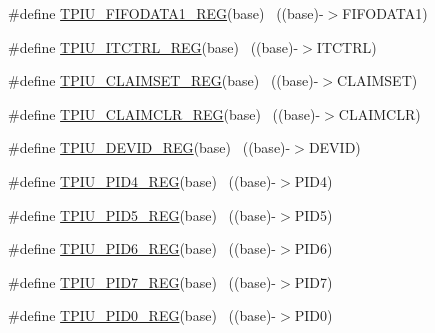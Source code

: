 \begin{DoxyCompactItemize}
\item 
\#define \hyperlink{group___t_p_i_u___register___accessor___macros_ga94e7646ffbef879b19b84538655f8661}{T\+P\+I\+U\+\_\+\+F\+I\+F\+O\+D\+A\+T\+A1\+\_\+\+R\+EG}(base)                              ~((base)-\/$>$F\+I\+F\+O\+D\+A\+T\+A1)
\item 
\#define \hyperlink{group___t_p_i_u___register___accessor___macros_ga3fb80a5db7419d9b28f36030fa56c9f6}{T\+P\+I\+U\+\_\+\+I\+T\+C\+T\+R\+L\+\_\+\+R\+EG}(base)                                    ~((base)-\/$>$I\+T\+C\+T\+RL)
\item 
\#define \hyperlink{group___t_p_i_u___register___accessor___macros_ga36e2ff51a935b49ba3848abac32d9771}{T\+P\+I\+U\+\_\+\+C\+L\+A\+I\+M\+S\+E\+T\+\_\+\+R\+EG}(base)                                ~((base)-\/$>$C\+L\+A\+I\+M\+S\+ET)
\item 
\#define \hyperlink{group___t_p_i_u___register___accessor___macros_ga0e17510140274c78c7590de1b5d39c75}{T\+P\+I\+U\+\_\+\+C\+L\+A\+I\+M\+C\+L\+R\+\_\+\+R\+EG}(base)                                ~((base)-\/$>$C\+L\+A\+I\+M\+C\+LR)
\item 
\#define \hyperlink{group___t_p_i_u___register___accessor___macros_ga30d4f93f5e89c158bb79417caf4daa37}{T\+P\+I\+U\+\_\+\+D\+E\+V\+I\+D\+\_\+\+R\+EG}(base)                                      ~((base)-\/$>$D\+E\+V\+ID)
\item 
\#define \hyperlink{group___t_p_i_u___register___accessor___macros_ga2fb69dcf92ae17576611bbaef82a311b}{T\+P\+I\+U\+\_\+\+P\+I\+D4\+\_\+\+R\+EG}(base)                                        ~((base)-\/$>$P\+I\+D4)
\item 
\#define \hyperlink{group___t_p_i_u___register___accessor___macros_ga23bae8088e08814bfd85ca65917ef08d}{T\+P\+I\+U\+\_\+\+P\+I\+D5\+\_\+\+R\+EG}(base)                                        ~((base)-\/$>$P\+I\+D5)
\item 
\#define \hyperlink{group___t_p_i_u___register___accessor___macros_ga135cc7558ac7d8d2cce7535a7f2b2a0e}{T\+P\+I\+U\+\_\+\+P\+I\+D6\+\_\+\+R\+EG}(base)                                        ~((base)-\/$>$P\+I\+D6)
\item 
\#define \hyperlink{group___t_p_i_u___register___accessor___macros_ga4beab80bc710cd3ade8c413ed28052c2}{T\+P\+I\+U\+\_\+\+P\+I\+D7\+\_\+\+R\+EG}(base)                                        ~((base)-\/$>$P\+I\+D7)
\item 
\#define \hyperlink{group___t_p_i_u___register___accessor___macros_ga8e2ec990e5e23265bc0bb9a09ff6a164}{T\+P\+I\+U\+\_\+\+P\+I\+D0\+\_\+\+R\+EG}(base)                                        ~((base)-\/$>$P\+I\+D0)

\end{DoxyCompactItemize}
